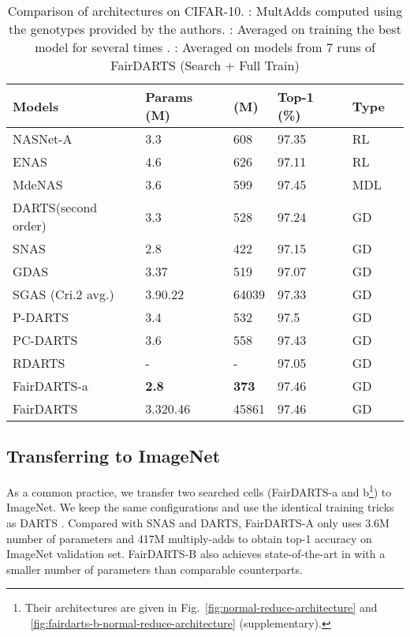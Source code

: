\documentclass[runningheads]{llncs}
\begin{document}
\setlength{\tabcolsep}{4pt}
\begin{table}
	\begin{center}
		\caption{Comparison of architectures on CIFAR-10. : MultAdds computed using the genotypes provided by the authors. : Averaged on training the best model for several times .   : Averaged on models from 7 runs of FairDARTS (Search + Full Train)} 
		\label{tab:comparison-cifar10}
	  \begin{footnotesize}
		\begin{tabular}{*{6}{l}} 			
		\hline\noalign{\smallskip}
			Models  & Params (M) &  (M) & Top-1 (\%) & Type  \\
\hline\noalign{\smallskip}
			NASNet-A \cite{zoph2017learning}  & 3.3 & 608  &  97.35 & RL \\
			ENAS \cite{pham2018efficient} & 4.6 & 626 & 97.11 & RL     \\	
			MdeNAS\cite{zheng2019multinomial} & 3.6 & 599 & 97.45 & MDL \\
			\hline\noalign{\smallskip}
			DARTS(second order)\cite{liu2018darts} & 3.3 & 528 & 97.24 & GD \\ 
SNAS \cite{xie2018snas}  & 2.8 & 422 & 97.15 & GD\\
			GDAS \cite{dong2019searching} & 3.37 & 519 & 97.07 &GD \\
			SGAS (Cri.2 avg.) \cite{li2019sgas} & 3.90.22 & 64039 & 97.33 & GD\\
			P-DARTS \cite{chen2019progressive} & 3.4 & 532 & 97.5 & GD \\ 
			PC-DARTS \cite{xu2019pc} & 3.6 & 558 & 97.43 & GD \\ 
			RDARTS \cite{zela2020understanding} &-& -& 97.05 & GD \\
			FairDARTS-a & \textbf{2.8} & \textbf{373} & 97.46 & GD \\ 
			FairDARTS & 3.320.46  & 45861 & 97.46 & GD \\
\hline
		\end{tabular}
		\end{footnotesize}
	\end{center}
\end{table}\setlength{\tabcolsep}{1.4pt}

\subsection{Transferring to ImageNet}
As a common practice, we transfer two searched cells (FairDARTS-a and b\footnote{Their architectures are given in Fig.~\ref{fig:normal-reduce-architecture} and ~\ref{fig:fairdarts-b-normal-reduce-architecture} (supplementary).}) to  ImageNet. We keep the same configurations and use the identical training tricks as DARTS \cite{liu2018darts}. Compared with SNAS \cite{xie2018snas} and DARTS, FairDARTS-A only uses 3.6M number of parameters and 417M multiply-adds to obtain  top-1 accuracy on ImageNet validation set. FairDARTS-B also achieves state-of-the-art  in  with a smaller number of parameters than comparable counterparts. 
\end{document}
